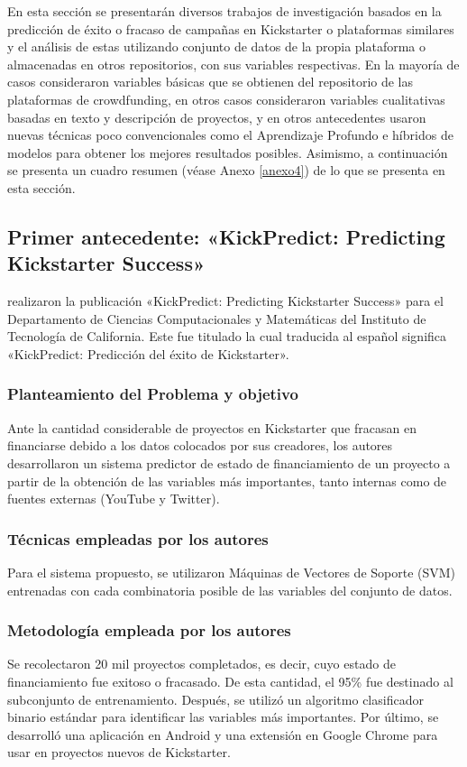 En esta sección se presentarán diversos trabajos de investigación basados en la predicción de éxito o fracaso de campañas en Kickstarter o plataformas similares y el análisis de estas utilizando conjunto de datos de la propia plataforma o almacenadas en otros repositorios, con sus variables respectivas. En la mayoría de casos consideraron variables básicas que se obtienen del repositorio de las plataformas de crowdfunding, en otros casos consideraron variables cualitativas basadas en texto y descripción de proyectos, y en otros antecedentes usaron nuevas técnicas poco convencionales como el Aprendizaje Profundo e híbridos de modelos para obtener los mejores resultados posibles.
Asimismo, a continuación se presenta un cuadro resumen (véase Anexo \ref{anexo4}) de lo que se presenta en esta sección.

\subsection{Primer antecedente: «KickPredict: Predicting Kickstarter Success» \citep*{pr_chen2013kickpredict}}
\citeauthor{pr_chen2013kickpredict} realizaron la publicación «KickPredict: Predicting Kickstarter Success» para el Departamento de Ciencias Computacionales y Matemáticas del Instituto de Tecnología de California. Este fue titulado  la cual traducida al español significa «KickPredict: Predicción del éxito de Kickstarter».

\subsubsection{Planteamiento del Problema y objetivo}
Ante la cantidad considerable de proyectos en Kickstarter que fracasan en financiarse debido a los datos colocados por sus creadores, los autores desarrollaron un sistema predictor de estado de financiamiento de un proyecto a partir de la obtención de las variables más importantes, tanto internas como de fuentes externas (YouTube y Twitter).

\subsubsection{Técnicas empleadas por los autores}
Para el sistema propuesto, se utilizaron Máquinas de Vectores de Soporte (SVM) entrenadas con cada combinatoria posible de las variables del conjunto de datos.

\subsubsection{Metodología empleada por los autores}
Se recolectaron 20 mil proyectos completados, es decir, cuyo estado de financiamiento fue exitoso o fracasado. De esta cantidad, el 95\% fue destinado al subconjunto de entrenamiento. Después, se utilizó un algoritmo clasificador binario estándar para identificar las variables más importantes. Por último, se desarrolló una aplicación en Android y una extensión en Google Chrome para usar en proyectos nuevos de Kickstarter.

